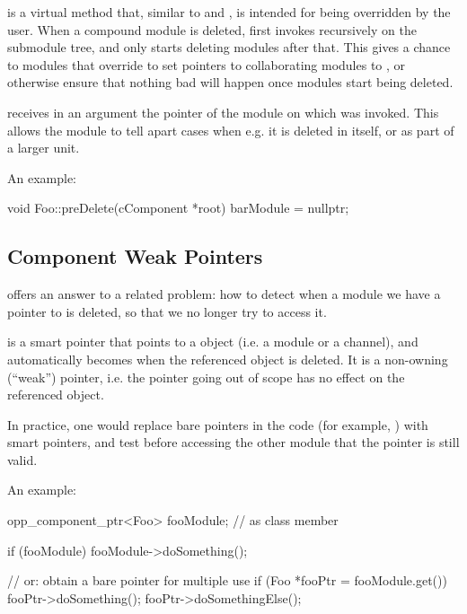  is a  virtual method that, similar to
 and , is intended for being overridden
by the user. When a compound module is deleted,  first
invokes  recursively on the submodule tree, and only starts
deleting modules after that. This gives a chance to modules that override
 to set pointers to collaborating modules to ,
or otherwise ensure that nothing bad will happen once modules start being
deleted.

 receives in an argument the pointer of the module on which
 was invoked. This allows the module to tell apart cases
when e.g. it is deleted in itself, or as part of a larger unit.

An example:

\begin{cpp}
void Foo::preDelete(cComponent *root)
{
    barModule = nullptr;
}
\end{cpp}


\subsection{Component Weak Pointers}
\label{sec:simple-modules:weak-compontent-ptr}

 offers an answer to a related problem: how to detect
when a module we have a pointer to is deleted, so that we no longer try to
access it.

 is a smart pointer that points to a
 object (i.e. a module or a channel), and automatically
becomes  when the referenced object is deleted. It is a non-owning
(``weak'') pointer, i.e. the pointer going out of scope has no effect on the
referenced object.

In practice, one would replace bare pointers in the code (for example,
) with  smart pointers, and test
before accessing the other module that the pointer is still valid.

An example:

\begin{cpp}
opp_component_ptr<Foo> fooModule;  // as class member

if (fooModule)
    fooModule->doSomething();

// or: obtain a bare pointer for multiple use
if (Foo *fooPtr = fooModule.get()) {
    fooPtr->doSomething();
    fooPtr->doSomethingElse();
}

\end{cpp}


